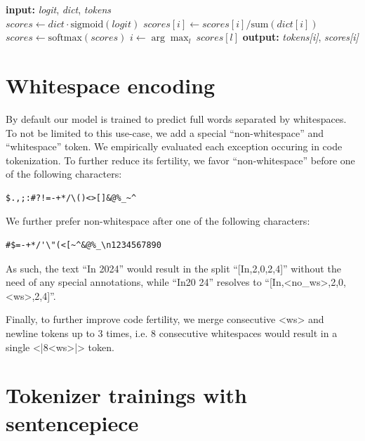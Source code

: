 \documentclass[11pt]{article}
\begin{document}
\begin{algorithm}[h!]
\caption{decode}\label{alg:decode}
\begin{algorithmic}
\State \textbf{input:} \emph{logit}, \emph{dict}, \emph{tokens}\\
\vspace{4px}
\State $scores \gets dict \cdot \textrm{sigmoid}(logit)$
\State $scores[i] \gets scores[i]/\textrm{sum}(dict[i])$
\EndFor
\State $scores \gets \textrm{softmax}(scores)$
\State $i \gets \arg\max_l\ scores[l]$\vspace{4px}
\State \textbf{output:} \emph{tokens[i]}, \emph{scores[i]}
\end{algorithmic}
\end{algorithm}

\section{Whitespace encoding}
\label{sec:whitespace}
By default our model is trained to predict full words separated by whitespaces. To not be limited to this use-case, we add a special ``non-whitespace'' and ``whitespace'' token. We empirically evaluated each exception occuring in code tokenization.
To further reduce its fertility, we favor ``non-whitespace'' before one of the following characters:
\begin{lstlisting}
$.,;:#?!=-+*/\()<>[]&@%_~^
\end{lstlisting}
We further prefer non-whitespace after one of the following characters:
\begin{lstlisting}
#$=-+*/'\"(<[~^&@%_\n1234567890
\end{lstlisting}

As such, the text ``In 2024'' would result in the split ``[In,2,0,2,4]'' without the need of any special annotations, while ``In20 24'' resolves to ``[In,<no\_ws>,2,0,<ws>,2,4]''.

Finally, to further improve code fertility, we merge consecutive <ws> and newline tokens up to 3 times, i.e. $8$ consecutive whitespaces would result in a single <|8<ws>|> token.

\section{Tokenizer trainings with sentencepiece}
\label{app:sentencepiece}
\end{document}
